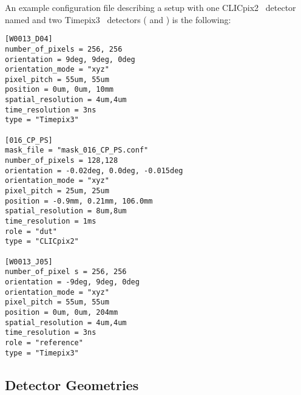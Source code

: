 An example configuration file describing a setup with one CLICpix2~\cite{clicpix2,clicpix2-pisa} detector named  and two Timepix3~\cite{timepix3} detectors ( and ) is the following:

\begin{verbatim}
[W0013_D04]
number_of_pixels = 256, 256
orientation = 9deg, 9deg, 0deg
orientation_mode = "xyz"
pixel_pitch = 55um, 55um
position = 0um, 0um, 10mm
spatial_resolution = 4um,4um
time_resolution = 3ns
type = "Timepix3"

[016_CP_PS]
mask_file = "mask_016_CP_PS.conf"
number_of_pixels = 128,128
orientation = -0.02deg, 0.0deg, -0.015deg
orientation_mode = "xyz"
pixel_pitch = 25um, 25um
position = -0.9mm, 0.21mm, 106.0mm
spatial_resolution = 8um,8um
time_resolution = 1ms
role = "dut"
type = "CLICpix2"

[W0013_J05]
number_of_pixel s = 256, 256
orientation = -9deg, 9deg, 0deg
orientation_mode = "xyz"
pixel_pitch = 55um, 55um
position = 0um, 0um, 204mm
spatial_resolution = 4um,4um
time_resolution = 3ns
role = "reference"
type = "Timepix3"
\end{verbatim}

\subsection{Detector Geometries}
\label{sec:detector_geometries}

